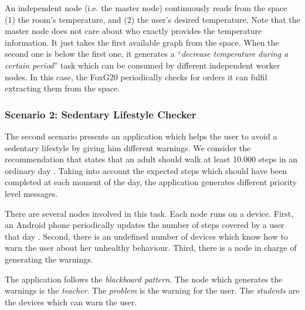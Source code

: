 

An independent node (i.e. the master node) continuously reads from the space %
(1) the room's temperature, and
(2) the user's desired temperature.
Note that the master node does not care about who exactly provides the temperature information.
It just takes the first available graph from the space.
When the second one is below the first one, it generates a ``\emph{decrease temperature during a certain period}'' task which can be consumed by different independent worker nodes.
In this case, the FoxG20 periodically checks for orders it can fulfil extracting them from the space. %



\subsubsection{Scenario 2: Sedentary Lifestyle Checker}

The second scenario presents an application which helps the user to avoid a sedentary lifestyle by giving him different warnings.
We consider the recommendation that states that an adult should walk at least 10.000 steps in an ordinary day \citep{tudor2002taking}.
Taking into account the expected steps which should have been completed at each moment of the day, the application generates different priority level messages.

There are several nodes involved in this task.
Each node runs on a device. %
First, an Android phone periodically updates the number of steps covered by a user that day .
Second, there is an undefined number of devices which know how to warn the user about her unhealthy behaviour.
Third, there is a node in charge of generating the warnings.


\medskip


The application follows the \emph{blackboard pattern}.
The node which generates the warnings is the \emph{teacher}.
The \emph{problem} is the warning for the user.
The \emph{students} are the devices which can warn the user. %


